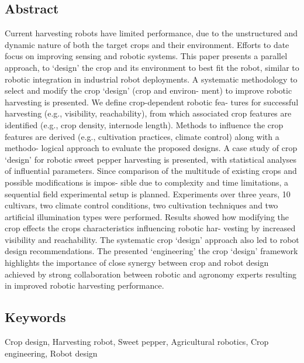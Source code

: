     \subsection*{Abstract}
    Current harvesting robots have limited performance, due to the unstructured and dynamic
    nature of both the target crops and their environment. Efforts to date focus on improving
    sensing and robotic systems. This paper presents a parallel approach, to ‘design’ the crop
    and its environment to best fit the robot, similar to robotic integration in industrial robot
    deployments.
    A systematic methodology to select and modify the crop ‘design’ (crop and environ-
    ment) to improve robotic harvesting is presented. We define crop-dependent robotic fea-
    tures for successful harvesting (e.g., visibility, reachability), from which associated crop
    features are identified (e.g., crop density, internode length). Methods to influence the crop
    features are derived (e.g., cultivation practices, climate control) along with a methodo-
    logical approach to evaluate the proposed designs. A case study of crop ‘design’ for robotic
    sweet pepper harvesting is presented, with statistical analyses of influential parameters.
    Since comparison of the multitude of existing crops and possible modifications is impos-
    sible due to complexity and time limitations, a sequential field experimental setup is
    planned. Experiments over three years, 10 cultivars, two climate control conditions, two
    cultivation techniques and two artificial illumination types were performed. Results
    showed how modifying the crop effects the crops characteristics influencing robotic har-
    vesting by increased visibility and reachability. The systematic crop ‘design’ approach also
    led to robot design recommendations. The presented ‘engineering’ the crop ‘design’
    framework highlights the importance of close synergy between crop and robot design
    achieved by strong collaboration between robotic and agronomy experts resulting in
    improved robotic harvesting performance.
    
    
    \subsection*{Keywords}
    Crop design, Harvesting robot, Sweet pepper, Agricultural robotics, Crop engineering, Robot design
    
    
     
